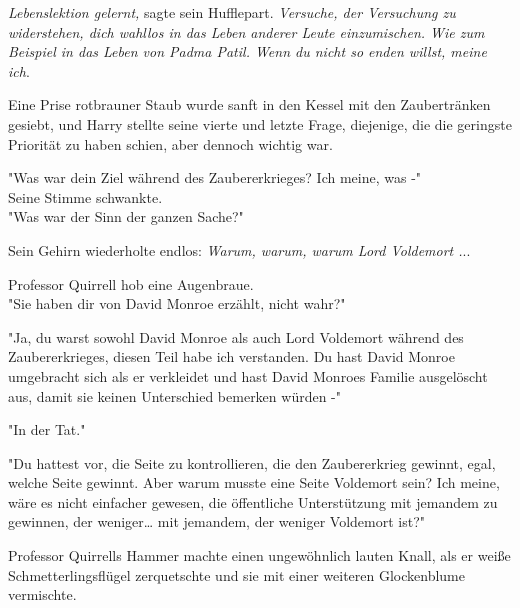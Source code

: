 {\emph{Lebenslektion gelernt,} sagte sein Hufflepart. \emph{Versuche, der Versuchung zu widerstehen, dich wahllos in das Leben anderer Leute einzumischen. Wie zum Beispiel in das Leben von Padma Patil. Wenn du nicht so enden willst, meine ich}.

Eine Prise rotbrauner Staub wurde sanft in den Kessel mit den Zaubertränken gesiebt, und Harry stellte seine vierte und letzte Frage, diejenige, die die geringste Priorität zu haben schien, aber dennoch wichtig war.

"Was war dein Ziel während des Zaubererkrieges? Ich meine, was -"\\ Seine Stimme schwankte.\\ "Was war der Sinn der ganzen Sache?"

Sein Gehirn wiederholte endlos: \emph{Warum, warum, warum Lord Voldemort .}..

Professor Quirrell hob eine Augenbraue.\\ "Sie haben dir von David Monroe erzählt, nicht wahr?"

"Ja, du warst sowohl David Monroe als auch Lord Voldemort während des Zaubererkrieges, diesen Teil habe ich verstanden. Du hast David Monroe umgebracht sich als er verkleidet und hast David Monroes Familie ausgelöscht aus, damit sie keinen Unterschied bemerken würden -"

"In der Tat."

"Du hattest vor, die Seite zu kontrollieren, die den Zaubererkrieg gewinnt, egal, welche Seite gewinnt. Aber warum musste eine Seite Voldemort sein? Ich meine, wäre es nicht einfacher gewesen, die öffentliche Unterstützung mit jemandem zu gewinnen, der weniger… mit jemandem, der weniger Voldemort ist?"

Professor Quirrells Hammer machte einen ungewöhnlich lauten Knall, als er weiße Schmetterlingsflügel zerquetschte und sie mit einer weiteren Glockenblume vermischte.

}
